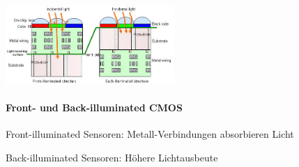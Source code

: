 \begin{multicols}{2}
    \includegraphics[width=0.48\textwidth]{images/cmos_iluminated} 
    \paragraph{Front- und Back-illuminated CMOS}
    \begin{compactitem}
        \item Front-illuminated Sensoren: Metall-Verbindungen absorbieren Licht 
        \item Back-illuminated Sensoren: Höhere Lichtausbeute
    \end{compactitem}
\end{multicols}


